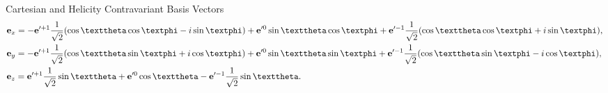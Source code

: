 Cartesian and Helicity Contravariant Basis Vectors
\begin{align}
& \vect{e}_{x}=-\vect{e}^{\prime+1} \frac{1}{\sqrt{2}}(\cos \vartheta \cos \varphi-i \sin \varphi)+\vect{e}^{\prime 0} \sin \vartheta \cos \varphi+\vect{e}^{\prime-1} \frac{1}{\sqrt{2}}(\cos \vartheta \cos \varphi+i \sin \varphi),  \notag\\
& \vect{e}_{y}=-\vect{e}^{\prime+1} \frac{1}{\sqrt{2}}(\cos \vartheta \sin \varphi+i \cos \varphi)+\vect{e}^{\prime 0} \sin \vartheta \sin \varphi+\vect{e}^{\prime-1} \frac{1}{\sqrt{2}}(\cos \vartheta \sin \varphi-i \cos \varphi),  \label{eq:1:1:32}\\
& \vect{e}_{z}=\vect{e}^{\prime+1} \frac{1}{\sqrt{2}} \sin \vartheta+\vect{e}^{\prime 0} \cos \vartheta-\vect{e}^{\prime-1} \frac{1}{\sqrt{2}} \sin \vartheta . \notag
\end{align}
